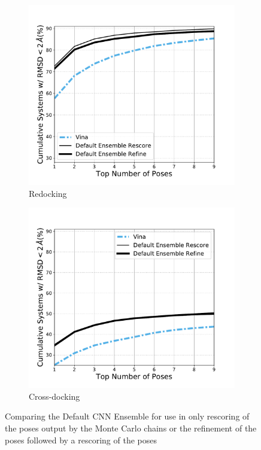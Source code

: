 \documentclass[journal=jcisd8,manuscript=article]{achemso}
\begin{document}
\begin{figure}    
        \begin{subfigure}[b]{0.48\textwidth}    
		\centering
		\includegraphics[width=\textwidth]{figures/redocking/rescore_vs_refine_line.pdf} 
		\caption{Redocking}
		\label{fig:CompareRescoreRefineRedock}
        \end{subfigure}    
        \begin{subfigure}[b]{0.48\textwidth}    
		\centering
		\includegraphics[width=\textwidth]{figures/crossdocking/rescore_vs_refine_line.pdf} 
		\caption{Cross-docking}
		\label{fig:CompareRescoreRefineCrossdock}
        \end{subfigure}    
	\caption{Comparing the Default CNN Ensemble for use in only rescoring of the poses output by the Monte Carlo chains or the refinement of the poses followed by a rescoring of the poses}
	\label{fig:CompareRescoreRefine}
\end{figure}    
\end{document}

